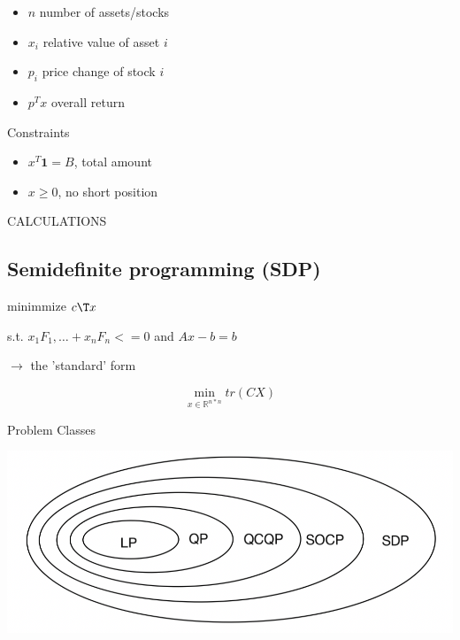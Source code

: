 \begin{itemize}
	\item $n$ number of assets/stocks
	\item $x_i$ relative value of asset $i$
	\item $p_i$ price change of stock $i$
	\item $p^Tx$ overall return
\end{itemize}

Constraints

\begin{itemize}
	\item $x^T\textbf{1} = B$, total amount
	\item $x\ge0$, no short position
\end{itemize}

CALCULATIONS

\subsection{Semidefinite programming (SDP)}

minimmize $c\T x$

s.t. $x_1F_1,\dots+x_nF_n <= 0$ and $Ax-b=b$

$\rightarrow$ the 'standard' form

$$\min _{x \in \mathbb{R}^{n*n}} tr(CX)$$

Problem Classes

\includegraphics[width=\columnwidth]{images/problem_class.png}
